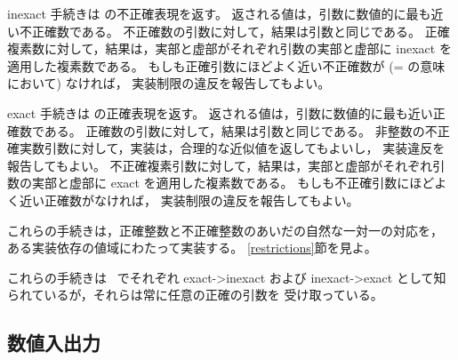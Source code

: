 \begin{entry}{%
}

{\cf inexact} 手続きは  の不正確表現を返す。
返される値は，引数に数値的に最も近い不正確数である。
不正確数の引数に対して，結果は引数と同じである。
正確複素数に対して，結果は，実部と虚部がそれぞれ引数の実部と虚部に
{\cf inexact} を適用した複素数である。
もしも正確引数にほどよく近い不正確数が ({\cf =} の意味において) なければ，
実装制限の違反を報告してもよい。

{\cf exact} 手続きは  の正確表現を返す。
返される値は，引数に数値的に最も近い正確数である。
正確数の引数に対して，結果は引数と同じである。
非整数の不正確実数引数に対して，実装は，合理的な近似値を返してもよいし，
実装違反を報告してもよい。
不正確複素引数に対して，結果は，実部と虚部がそれぞれ引数の実部と虚部に
{\cf exact} を適用した複素数である。
もしも不正確引数にほどよく近い正確数がなければ，
実装制限の違反を報告してもよい。

これらの手続きは，正確整数と不正確整数のあいだの自然な一対一の対応を，
ある実装依存の値域にわたって実装する。
\ref{restrictions}節を見よ。

\begin{note}
これらの手続きは \rfivers\ でそれぞれ {\cf exact->inexact} および
{\cf inexact->exact} として知られているが，それらは常に任意の正確の引数を
受け取っている。
\end{note}

\end{entry}

\medskip

\subsection{数値入出力}

